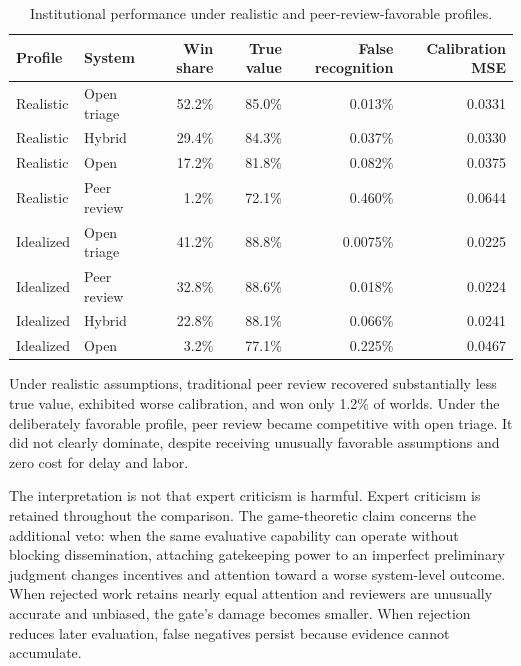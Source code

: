 \documentclass[11pt]{article}
\begin{document}
\begin{table}[ht]
\centering
\caption{Institutional performance under realistic and peer-review-favorable profiles.}
\label{tab:profiles}
\small
\begin{tabular}{llrrrr}
\toprule
Profile & System & Win share & True value & False recognition & Calibration MSE\\
\midrule
Realistic & Open triage & 52.2\% & 85.0\% & 0.013\% & 0.0331\\
Realistic & Hybrid & 29.4\% & 84.3\% & 0.037\% & 0.0330\\
Realistic & Open & 17.2\% & 81.8\% & 0.082\% & 0.0375\\
Realistic & Peer review & 1.2\% & 72.1\% & 0.460\% & 0.0644\\
\midrule
Idealized & Open triage & 41.2\% & 88.8\% & 0.0075\% & 0.0225\\
Idealized & Peer review & 32.8\% & 88.6\% & 0.018\% & 0.0224\\
Idealized & Hybrid & 22.8\% & 88.1\% & 0.066\% & 0.0241\\
Idealized & Open & 3.2\% & 77.1\% & 0.225\% & 0.0467\\
\bottomrule
\end{tabular}
\end{table}

Under realistic assumptions, traditional peer review recovered substantially less true value, exhibited worse calibration, and won only 1.2\% of worlds. Under the deliberately favorable profile, peer review became competitive with open triage. It did not clearly dominate, despite receiving unusually favorable assumptions and zero cost for delay and labor.

The interpretation is not that expert criticism is harmful. Expert criticism is retained throughout the comparison. The game-theoretic claim concerns the additional veto: when the same evaluative capability can operate without blocking dissemination, attaching gatekeeping power to an imperfect preliminary judgment changes incentives and attention toward a worse system-level outcome. When rejected work retains nearly equal attention and reviewers are unusually accurate and unbiased, the gate's damage becomes smaller. When rejection reduces later evaluation, false negatives persist because evidence cannot accumulate.
\end{document}

